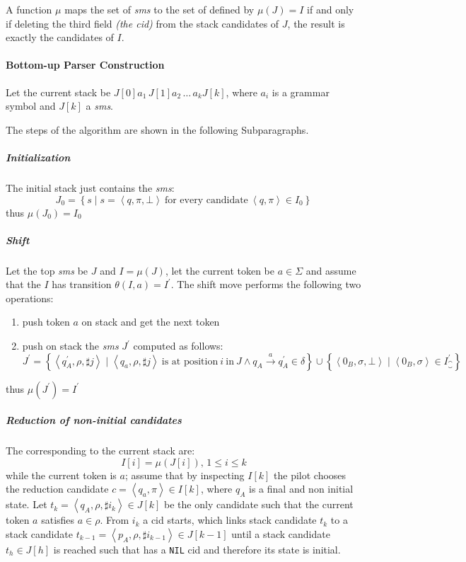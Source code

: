 \documentclass[english]{article}
\begin{document}
A function \(\mu\) maps the set of \textit{sms} to the set of \mstates defined by \(\mu(J) = I\) if and only if deleting the third field \textit{(the cid)} from the stack candidates of \(J\), the result is exactly the candidates of \(I\).

\paragraph{Bottom-up Parser Construction}
\label{par:parser-algorithm-bottom-up}

Let the current stack be \(J[0] a_1 \, J[1] a_2 \, \ldots \, a_k J[k]\), where \(a_i\) is a grammar symbol and \(J[k]\) a \textit{sms}.

The steps of the algorithm are shown in the following Subparagraphs.

\subparagraph*{Initialization}
The initial stack just contains the \textit{sms}:
\[ J_0 = \left\{ s \mid s = \left\langle q, \pi, \bot \right\rangle \ \text{for every candidate} \ \left\langle q, \pi \right\rangle \in I_0 \right\} \]
thus \(\mu(J_0) = I_0\)

\subparagraph*{Shift}
Let the top \textit{sms} be \(J\) and \(I = \mu(J)\), let the current token be \(a \in \Sigma\) and assume that the \mstate \(I\) has transition \(\theta(I, a) = I^\prime\). The shift move performs the following two operations:
\begin{enumerate}[label=\arabic*., ref=(\arabic*)]
  \item\label{enum:shift-move-1} push token \(a\) on stack and get the next token
  \item\label{enum:shift-move-2} push on stack the \textit{sms} \(J^\prime\) computed as follows:
  \[
    J^\prime  =  \left\{ \left\langle q_A^\prime, \rho, \sharp j \right\rangle \mid \left\langle q_a, \rho, \sharp j \right\rangle \ \text{is at position} \ i \ \text{in} \ J \land q_A \xrightarrow{a} q_A^\prime \in \delta \right\}
    \cup         \left\{ \left\langle 0_B, \sigma, \bot \right\rangle \mid \left\langle 0_B, \sigma  \right\rangle \in I_{\closure}^\prime \right\}
  \]
\end{enumerate}
thus \(\mu(J^\prime) = I^\prime\)

\subparagraph*{Reduction of non-initial candidates}

The \mstates corresponding to the current stack are:
\[ I[i] = \mu\left( J[i] \right), \, 1 \leq i \leq k \]
while the current token is \(a\);
assume that by inspecting \(I[k]\) the pilot chooses the reduction candidate \(c = \left\langle q_a, \pi \right\rangle \in I[k]\), where \(q_A\) is a final and non initial state.
Let \(t_k = \left\langle q_A, \rho, \sharp i_k \right\rangle \in J[k]\) be the only candidate such that the current token \(a\) satisfies \(a \in \rho\).
From \(i_k\) a cid starts, which links stack candidate \(t_k\) to a stack candidate \(t_{k-1} = \left\langle p_A, \rho, \sharp i_{k-1} \right\rangle \in J[k-1]\) until a stack candidate \(t_h \in J[h]\) is reached such that has a \texttt{NIL} cid and therefore its state is initial.
\end{document}
